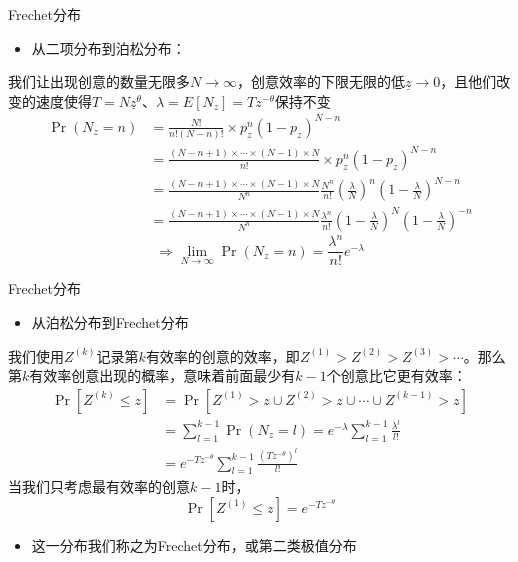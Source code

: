 \documentclass{beamer}
\begin{document}
\begin{frame}{Frechet分布}
\begin{itemize}
    \item 从二项分布到泊松分布：
\end{itemize}
我们让出现创意的数量无限多\(N\rightarrow\infty\)，创意效率的下限无限的低\(\underline{z}\rightarrow 0\)，且他们改变的速度使得\(T=N\underline{z}^{\theta}\)、\(\lambda=E[N_{z}]=Tz^{-\theta}\)保持不变
\footnotesize
\begin{align*}
    \Pr(N_{z}=n)&=\frac{N!}{n!\left(N-n\right)!}\times p_{z}^{n}\left(1-p_{z}\right)^{N-n}\\&=\frac{\left(N-n+1\right)\times\cdots\times\left(N-1\right)\times N}{n!}\times p_{z}^{n}\left(1-p_{z}\right)^{N-n}\\&=\frac{\left(N-n+1\right)\times\cdots\times\left(N-1\right)\times N}{N^{n}}\frac{N^{n}}{n!}\left(\frac{\lambda}{N}\right)^{n}\left(1-\frac{\lambda}{N}\right)^{N-n}\\&=\frac{\left(N-n+1\right)\times\cdots\times\left(N-1\right)\times N}{N^{n}}\frac{\lambda^{n}}{n!}\left(1-\frac{\lambda}{N}\right)^{N}\left(1-\frac{\lambda}{N}\right)^{-n}
\end{align*}
\[\Longrightarrow \lim_{N\rightarrow\infty}\Pr(N_{z}=n)=\frac{\lambda^{n}}{n!}e^{-\lambda}\]
\end{frame}

\begin{frame}{Frechet分布}
    \begin{itemize}
        \item 从泊松分布到Frechet分布
    \end{itemize}
我们使用\(Z^{(k)}\)记录第\(k\)有效率的创意的效率，即\(Z^{(1)}>Z^{(2)}>Z^{(3)}>\cdots\)。那么第\(k\)有效率创意出现的概率，意味着前面最少有\(k-1\)个创意比它更有效率：
\begin{align*}
    \Pr[Z^{(k)}\leq z]&=\Pr[Z^{(1)}>z\cup Z^{(2)}>z\cup\cdots\cup Z^{(k-1)}>z]\\&=\sum_{l=1}^{k-1}\Pr(N_{z}=l)=e^{-\lambda}\sum_{l=1}^{k-1}\frac{\lambda^{l}}{l!}\\&=e^{-Tz^{-\theta}}\sum_{l=1}^{k-1}\frac{\left(Tz^{-\theta}\right)^{l}}{l!}
\end{align*}
当我们只考虑最有效率的创意\(k-1\)时，
\[\Pr[Z^{(1)}\leq z]=e^{-Tz^{-\theta}}\]
\begin{itemize}
    \item 这一分布我们称之为Frechet分布，或第二类极值分布
\end{itemize}
\end{frame}
\end{document}
